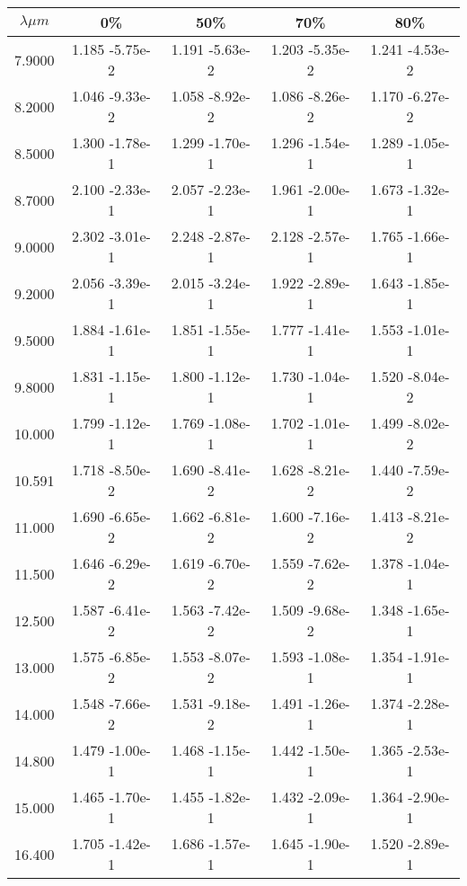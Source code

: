 \documentclass[12pt]{article}
\begin{document}
\begin{center}
\begin{table}
\begin{tabular}{| c | c | c | c | c |  }
\hline
 $\lambda \mu m$   & 0\%  & 50\%  & 70\%  & 80\% \\
\hline
7.9000 &  1.185 -5.75e-2 &  1.191   -5.63e-2 &   1.203   -5.35e-2  &   1.241   -4.53e-2     \\
8.2000 &  1.046 -9.33e-2 &  1.058   -8.92e-2 &   1.086   -8.26e-2  &   1.170   -6.27e-2     \\
8.5000 &  1.300 -1.78e-1 &  1.299   -1.70e-1 &   1.296   -1.54e-1  &   1.289   -1.05e-1     \\
8.7000 &  2.100 -2.33e-1 &  2.057   -2.23e-1 &   1.961   -2.00e-1  &   1.673   -1.32e-1    \\
9.0000 &  2.302 -3.01e-1 &  2.248   -2.87e-1 &   2.128   -2.57e-1  &   1.765   -1.66e-1     \\
9.2000 &  2.056 -3.39e-1 &  2.015   -3.24e-1 &   1.922   -2.89e-1  &   1.643   -1.85e-1     \\
9.5000 &  1.884 -1.61e-1 &  1.851   -1.55e-1 &   1.777   -1.41e-1  &   1.553   -1.01e-1     \\
9.8000 &  1.831 -1.15e-1 &  1.800   -1.12e-1 &   1.730   -1.04e-1  &   1.520   -8.04e-2     \\
10.000 &  1.799 -1.12e-1 &  1.769   -1.08e-1  &  1.702   -1.01e-1  &   1.499   -8.02e-2     \\
10.591 &  1.718 -8.50e-2 &  1.690   -8.41e-2 &   1.628   -8.21e-2  &   1.440   -7.59e-2     \\
11.000 &  1.690 -6.65e-2 &  1.662   -6.81e-2 &   1.600   -7.16e-2  &   1.413   -8.21e-2    \\
11.500 &  1.646 -6.29e-2 &  1.619   -6.70e-2 &   1.559   -7.62e-2  &   1.378   -1.04e-1     \\
12.500 &  1.587 -6.41e-2 &  1.563   -7.42e-2 &   1.509   -9.68e-2   &  1.348   -1.65e-1    \\
13.000 &  1.575 -6.85e-2 &  1.553   -8.07e-2 &   1.593   -1.08e-1  &   1.354   -1.91e-1     \\
14.000 &  1.548 -7.66e-2 &  1.531   -9.18e-2 &   1.491   -1.26e-1  &   1.374   -2.28e-1     \\
14.800 &  1.479 -1.00e-1 &  1.468   -1.15e-1 &   1.442   -1.50e-1  &   1.365   -2.53e-1    \\
15.000 &  1.465 -1.70e-1 &  1.455   -1.82e-1 &   1.432   -2.09e-1  &   1.364   -2.90e-1   \\
16.400 &  1.705 -1.42e-1 &  1.686   -1.57e-1 &   1.645   -1.90e-1  &   1.520   -2.89e-1    \\

\end{tabular}
\end{table}
\end{center}
\end{document}

